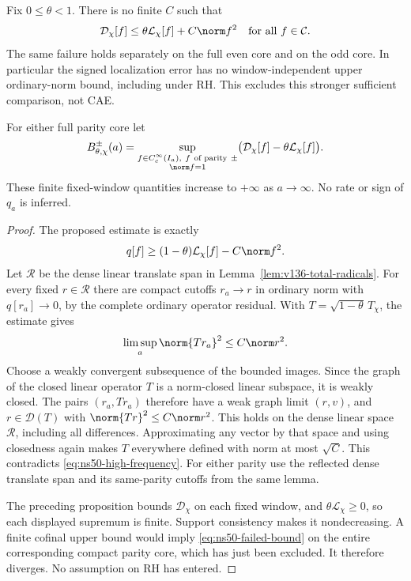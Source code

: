 \begin{proposition}
\label{prop:ns50-critical-coefficient}
Fix $0\le\theta<1$. There is no finite $C$ such that
\begin{equation}\label{eq:ns50-failed-bound}
 \mathcal D_\chi[f]\le
            \theta\mathcal L_\chi[f]+C\norm f^2
 \quad\hbox{for all }f\in\mathcal C.
\end{equation}
The same failure holds separately on the full even core and on the
odd core. In particular the signed localization error has no
window-independent upper ordinary-norm bound, including under RH.
This excludes this stronger sufficient comparison, not CAE.

For either full parity core let
\[
 B_{\theta,\chi}^{\pm}(a)=
 \sup_{\substack{f\in C_c^\infty(I_a),\ f\ \text{of parity}\ \pm\\
                 \norm f=1}}
   \bigl(\mathcal D_\chi[f]-\theta\mathcal L_\chi[f]\bigr).
\]
These finite fixed-window quantities increase to $+\infty$ as
$a\to\infty$. No rate or sign of $q_a$ is inferred.
\end{proposition}
\begin{proof}
The proposed estimate is exactly
\[
 q[f]\ge(1-\theta)\mathcal L_\chi[f]-C\norm f^2.
\]
Let $\mathcal R$ be the dense linear translate span in
Lemma~\ref{lem:v136-total-radicals}. For every fixed $r\in\mathcal R$
there are compact cutoffs $r_a\to r$ in ordinary norm with
$q[r_a]\to0$, by the complete ordinary operator residual.
With $T=\sqrt{1-\theta}\,T_\chi$, the estimate gives
\[
 \limsup_a\norm{Tr_a}^2\le C\norm r^2.
\]
Choose a weakly convergent subsequence of the bounded images. Since
the graph of the closed linear operator $T$ is a norm-closed linear
subspace, it is weakly closed. The pairs $(r_a,Tr_a)$ therefore have
a weak graph limit $(r,v)$, and
$r\in\mathcal D(T)$ with $\norm{Tr}^2\le C\norm r^2$.
This holds on the dense linear space $\mathcal R$, including all
differences. Approximating any vector by that space and using
closedness again makes $T$ everywhere defined with norm at most
$\sqrt C$. This contradicts \eqref{eq:ns50-high-frequency}.
For either parity use the reflected dense translate span and its
same-parity cutoffs from the same lemma.

The preceding proposition bounds $\mathcal D_\chi$ on each fixed
window, and $\theta\mathcal L_\chi\ge0$, so each displayed supremum
is finite. Support consistency makes it nondecreasing. A finite
cofinal upper bound would imply \eqref{eq:ns50-failed-bound} on
the entire corresponding compact parity core, which has just been
excluded. It therefore diverges. No assumption on RH has entered.
\end{proof}

